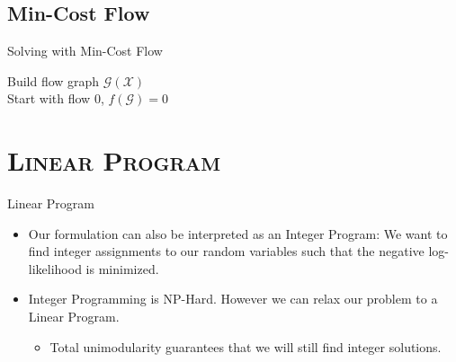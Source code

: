 \subsection{Min-Cost Flow}
\begin{frame}{Solving with Min-Cost Flow}
	\begin{algorithm}[H]
		\vspace{5px}

		\vspace{10px}
		Build flow graph $\mathcal{G}(\mathcal{X})$\\
		Start with flow 0, $f(\mathcal{G}) = 0$\\
	\end{algorithm}
\end{frame}


\section{\scshape Linear Program}
\begin{frame}{Linear Program}
	\begin{itemize}
		\item Our formulation can also be interpreted as an Integer Program: We want to find integer assignments to our random variables such that the negative log-likelihood is minimized.
		\item Integer Programming is NP-Hard. However we can relax our problem to a Linear Program.
		\begin{itemize}
			\item Total unimodularity guarantees that we will still find integer solutions.
		\end{itemize}
	\end{itemize}
\end{frame}


